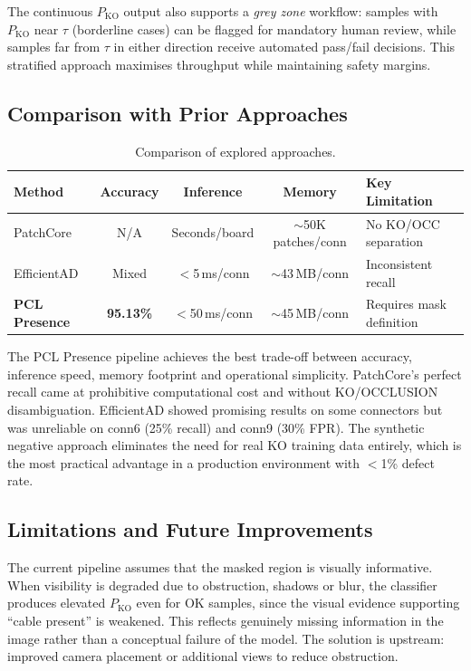 \documentclass[11pt,a4paper,draft]{article}
\begin{document}
The continuous $P_{\mathrm{KO}}$ output also supports a \emph{grey zone} workflow: samples with $P_{\mathrm{KO}}$ near $\tau$ (borderline cases) can be flagged for mandatory human review, while samples far from $\tau$ in either direction receive automated pass/fail decisions. This stratified approach maximises throughput while maintaining safety margins.

\subsection{Comparison with Prior Approaches}

\begin{table}[H]
\centering
\small
\begin{tabular}{lcccl}
\toprule
Method & Accuracy & Inference & Memory & Key Limitation \\
\midrule
PatchCore & N/A & Seconds/board & $\sim$50K patches/conn & No KO/OCC separation \\
EfficientAD & Mixed & $<$5\,ms/conn & $\sim$43\,MB/conn & Inconsistent recall \\
\textbf{PCL Presence} & \textbf{95.13\%} & $<$50\,ms/conn & $\sim$45\,MB/conn & Requires mask definition \\
\bottomrule
\end{tabular}
\caption{Comparison of explored approaches.}
\label{tab:comparison}
\end{table}

The PCL Presence pipeline achieves the best trade-off between accuracy, inference speed, memory footprint and operational simplicity. PatchCore's perfect recall came at prohibitive computational cost and without KO/OCCLUSION disambiguation. EfficientAD showed promising results on some connectors but was unreliable on conn6 (25\% recall) and conn9 (30\% FPR). The synthetic negative approach eliminates the need for real KO training data entirely, which is the most practical advantage in a production environment with $<$1\% defect rate.

\subsection{Limitations and Future Improvements}

The current pipeline assumes that the masked region is visually informative. When visibility is degraded due to obstruction, shadows or blur, the classifier produces elevated $P_{\mathrm{KO}}$ even for OK samples, since the visual evidence supporting ``cable present'' is weakened. This reflects genuinely missing information in the image rather than a conceptual failure of the model. The solution is upstream: improved camera placement or additional views to reduce obstruction.
\end{document}
